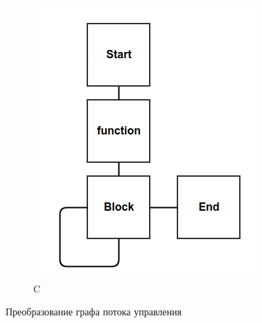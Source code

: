 \documentclass[14pt]{matmex-diploma}
\begin{document}
\begin{figure}
\begin{subfigure}[b]{0.4\textwidth}
        \includegraphics[width=\textwidth]{images/blockScheme3.png}
        \caption{C}
        \label{fig:C}
    \end{subfigure}
    \caption{Преобразование графа потока управления}
\end{figure}
\end{document}
